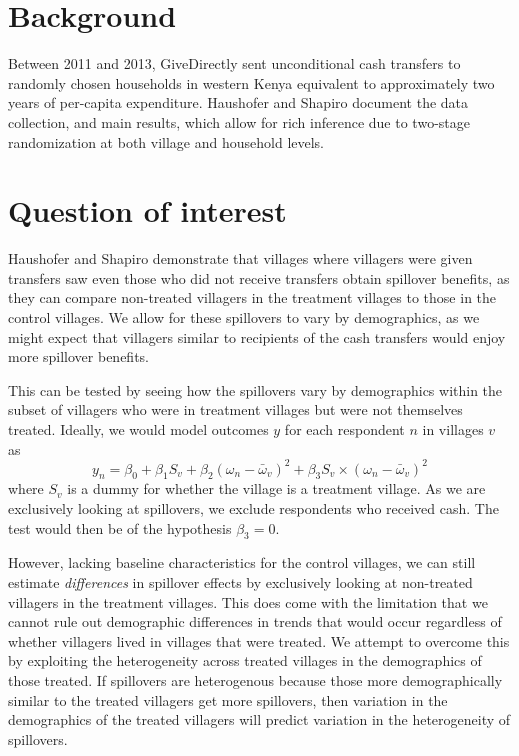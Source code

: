 \documentclass[11pt]{article}
\begin{document}
\section{Background}

Between 2011 and 2013, GiveDirectly sent unconditional cash transfers to randomly chosen households in western Kenya equivalent to approximately two years of per-capita expenditure.
Haushofer and Shapiro document the data collection, and main results, which allow for rich inference due to two-stage randomization at both village and household levels.


\section{Question of interest}

Haushofer and Shapiro demonstrate that villages where villagers were given transfers saw even those who did not receive transfers obtain spillover benefits, as they can compare non-treated villagers in the treatment villages to those in the control villages.
We allow for these spillovers to vary by demographics, as we might expect that villagers similar to recipients of the cash transfers would enjoy more spillover benefits.

This can be tested by seeing how the spillovers vary by demographics within the subset of villagers who were in treatment villages but were not themselves treated.
Ideally, we would model outcomes $y$ for each respondent $n$ in villages $v$ as
\begin{equation*}
y_n = \beta_0 + \beta_1 S_v + \beta_2 (\omega_n - \bar{\omega}_v)^2 + \beta_3 S_v \times  (\omega_n - \bar{\omega}_v)^2
\end{equation*}
where $S_v$ is a dummy for whether the village is a treatment village.
As we are exclusively looking at spillovers, we exclude respondents who received cash.
The test would then be of the hypothesis $\beta_3 = 0$.

However, lacking baseline characteristics for the control villages, we can still estimate \textit{differences} in spillover effects by exclusively looking at non-treated villagers in the treatment villages.
This does come with the limitation that we cannot rule out demographic differences in trends that would occur regardless of whether villagers lived in villages that were treated.
We attempt to overcome this by exploiting the heterogeneity across treated villages in the demographics of those treated.
If spillovers are heterogenous because those more demographically similar to the treated villagers get more spillovers, then variation in the demographics of the treated villagers will predict variation in the heterogeneity of spillovers.
\end{document}
